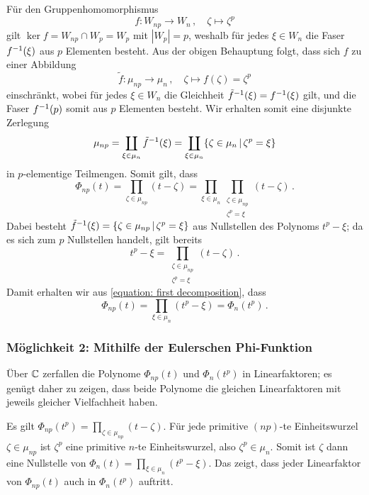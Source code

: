 Für den Gruppenhomomorphismus
\[
          f
  \colon  W_{np}
  \to     W_n \,,
  \quad   \zeta
  \mapsto \zeta^p
\]
gilt $\ker f = W_{np} \cap W_p = W_p$ mit $|W_p| = p$, weshalb für jedes $\xi \in W_n$ die Faser $f^{-1}(\xi)$ aus $p$ Elementen besteht.
Aus der obigen Behauptung folgt, dass sich $f$ zu einer Abbildung
\[
          \tilde{f}
  \colon  \mu_{np}
  \to     \mu_n \,,
  \quad   \zeta
  \mapsto f(\zeta)
  =       \zeta^p
\]
einschränkt, wobei für jedes $\xi \in W_n$ die Gleichheit $\tilde{f}^{-1}(\xi) = f^{-1}(\xi)$ gilt, und die Faser $f^{-1}(p)$ somit aus $p$ Elementen besteht.
Wir erhalten somit eine disjunkte Zerlegung
\[
    \mu_{np}
    = \coprod_{\xi \in \mu_n} \preim{\tilde{f}}{\xi}
    = \coprod_{\xi \in \mu_n} \{ \zeta \in \mu_n \suchthat \zeta^p = \xi \}
\]
in $p$-elementige Teilmengen.
Somit gilt, dass
\begin{equation}
  \label{equation: first decomposition}
    \Phi_{np}(t)
  = \prod_{\zeta \in \mu_{np}} (t - \zeta)
  = \prod_{\xi \in \mu_n} \prod_{\substack{\zeta \in \mu_{np} \\ \zeta^p = \xi}} (t - \zeta) \,.
\end{equation}
Dabei besteht $\preim{\tilde{f}}{\xi} = \{ \zeta \in \mu_{np} \suchthat \zeta^p = \xi \}$ aus Nullstellen des Polynoms $t^p - \xi$;
da es sich zum $p$ Nullstellen handelt, gilt bereits
\[
    t^p - \xi
  = \prod_{\substack{\zeta \in \mu_{np} \\ \zeta^p = \xi}} (t - \zeta) \,.
\]
Damit erhalten wir aus \eqref{equation: first decomposition}, dass
\[
    \Phi_{np}(t)
  = \prod_{\xi \in \mu_n} (t^p - \xi)
  = \Phi_n(t^p) \,.
\]



\subsubsection*{Möglichkeit 2: Mithilfe der Eulerschen Phi-Funktion}

Über $\mathbb{C}$ zerfallen die Polynome $\Phi_{np}(t)$ und $\Phi_n(t^p)$ in Linearfaktoren;
es genügt daher zu zeigen, dass beide Polynome die gleichen Linearfaktoren mit jeweils gleicher Vielfachheit haben.

Es gilt $\Phi_{np}(t^p) = \prod_{\zeta \in \mu_{np}} (t - \zeta)$.
Für jede primitive $(np)$-te Einheitswurzel $\zeta \in \mu_{np}$ ist $\zeta^p$ eine primitive $n$-te Einheitswurzel, also $\zeta^p \in \mu_n$.
Somit ist $\zeta$ dann eine Nullstelle von $\Phi_n(t) = \prod_{\xi \in \mu_n} (t^p - \xi)$.
Das zeigt, dass jeder Linearfaktor von $\Phi_{np}(t)$ auch in $\Phi_n(t^p)$ auftritt.

